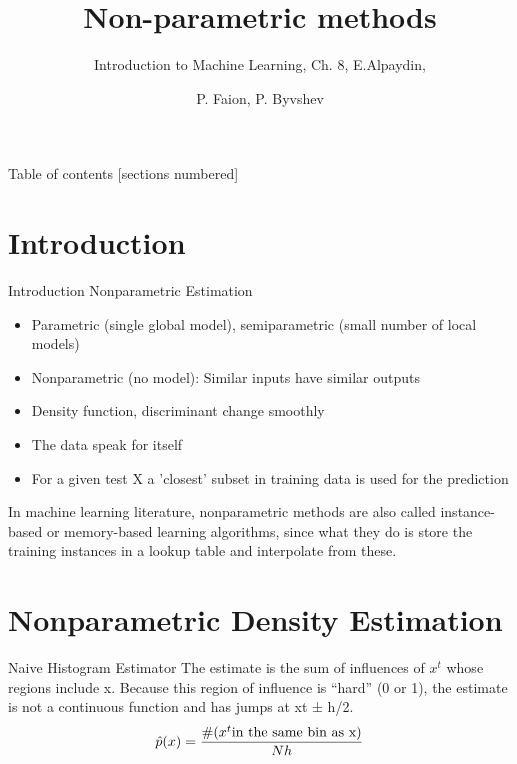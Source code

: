 \documentclass{beamer}
\title{Non-parametric methods}
\subtitle{Introduction to 
Machine Learning, Ch. 8, E.Alpaydin, }
\date{}
\author{P. Faion, P. Byvshev}
\institute{University of Osnabr\"uck - Advanced Machine Learning Seminar}
\begin{document}
\maketitle

\begin{frame}{Table of contents}
  [sections numbered]
  \tableofcontents[hideallsubsections]
\end{frame}

\section{Introduction}

\begin{frame}[fragile]{Introduction}
Nonparametric Estimation
	\begin{itemize}
		\item Parametric (single global model), semiparametric (small number of local models)
		\item Nonparametric (no model): Similar inputs have similar outputs
		\item Density function, discriminant change smoothly
		\item The data speak for itself
        \item For a given test X a 'closest' subset in training data is used for the prediction 
	\end{itemize}
In machine learning literature, nonparametric methods are also called
instance-based or memory-based learning algorithms, since what they do
is store the training instances in a lookup table and interpolate from
these.
    



\end{frame}


\section{Nonparametric Density Estimation}

\begin{frame}[fragile]{Naive Histogram Estimator}
The estimate is the sum of influences of $x^t$ whose regions include x.
Because this region of influence is “hard” (0 or 1), the estimate is not a
continuous function and has jumps at xt ± h/2.
	\begin{equation}
		\hat p(x)=\frac{\#(x^t \textnormal{in the same bin as x})}{Nh}
	\end{equation}

\end{frame}
\end{document}
